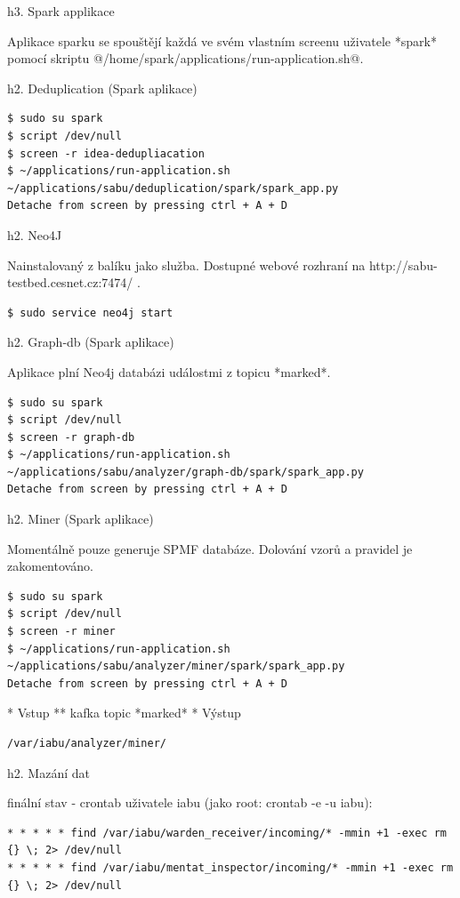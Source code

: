 \documentclass[a4paper]{article} %
\begin{document}
h3. Spark applikace

Aplikace sparku se spouštějí každá ve svém vlastním screenu uživatele *spark* pomocí skriptu @/home/spark/applications/run-application.sh@.

h2. Deduplication (Spark aplikace)

\begin{lstlisting}[]
$ sudo su spark
$ script /dev/null
$ screen -r idea-dedupliacation
$ ~/applications/run-application.sh ~/applications/sabu/deduplication/spark/spark_app.py
Detache from screen by pressing ctrl + A + D
\end{lstlisting}

h2. Neo4J

Nainstalovaný z balíku jako služba. Dostupné webové rozhraní na http://sabu-testbed.cesnet.cz:7474/ .

\begin{lstlisting}[]
$ sudo service neo4j start
\end{lstlisting}

h2. Graph-db (Spark aplikace)

Aplikace plní Neo4j databázi událostmi z topicu *marked*.

\begin{lstlisting}[]
$ sudo su spark
$ script /dev/null
$ screen -r graph-db
$ ~/applications/run-application.sh ~/applications/sabu/analyzer/graph-db/spark/spark_app.py
Detache from screen by pressing ctrl + A + D
\end{lstlisting}

h2. Miner (Spark aplikace)

Momentálně pouze generuje SPMF databáze. Dolování vzorů a pravidel je zakomentováno.

\begin{lstlisting}[]
$ sudo su spark
$ script /dev/null
$ screen -r miner
$ ~/applications/run-application.sh ~/applications/sabu/analyzer/miner/spark/spark_app.py
Detache from screen by pressing ctrl + A + D
\end{lstlisting}

* Vstup
** kafka topic *marked*
* Výstup
\begin{lstlisting}[]
/var/iabu/analyzer/miner/
\end{lstlisting}

h2. Mazání dat

finální stav - crontab uživatele iabu (jako root: crontab -e -u iabu):
\begin{lstlisting}[]
* * * * * find /var/iabu/warden_receiver/incoming/* -mmin +1 -exec rm {} \; 2> /dev/null
* * * * * find /var/iabu/mentat_inspector/incoming/* -mmin +1 -exec rm {} \; 2> /dev/null
\end{lstlisting}
\end{document}
